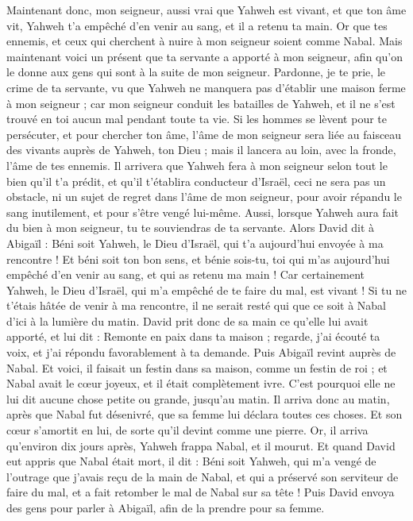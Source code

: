 \begin{multicols}{2}
Maintenant donc, mon seigneur, aussi vrai que Yahweh est vivant, et que ton âme vit, Yahweh t'a empêché d'en venir au sang, et il a retenu ta main. Or que tes ennemis, et ceux qui cherchent à nuire à mon seigneur soient comme Nabal.
Mais maintenant voici un présent que ta servante a apporté à mon seigneur, afin qu'on le donne aux gens qui sont à la suite de mon seigneur.
Pardonne, je te prie, le crime de ta servante, vu que Yahweh ne manquera pas d'établir une maison ferme à mon seigneur ; car mon seigneur conduit les batailles de Yahweh, et il ne s'est trouvé en toi aucun mal pendant toute ta vie.
Si les hommes se lèvent pour te persécuter, et pour chercher ton âme, l'âme de mon seigneur sera liée au faisceau des vivants auprès de Yahweh, ton Dieu ; mais il lancera au loin, avec la fronde, l'âme de tes ennemis.
Il arrivera que Yahweh fera à mon seigneur selon tout le bien qu'il t'a prédit, et qu'il t'établira conducteur d'Israël,
ceci ne sera pas un obstacle, ni un sujet de regret dans l'âme de mon seigneur, pour avoir répandu le sang inutilement, et pour s'être vengé lui-même. Aussi, lorsque Yahweh aura fait du bien à mon seigneur, tu te souviendras de ta servante.
Alors David dit à Abigaïl : Béni soit Yahweh, le Dieu d'Israël, qui t'a aujourd'hui envoyée à ma rencontre !
Et béni soit ton bon sens, et bénie sois-tu, toi qui m'as aujourd'hui empêché d'en venir au sang, et qui as retenu ma main !
Car certainement Yahweh, le Dieu d'Israël, qui m'a empêché de te faire du mal, est vivant ! Si tu ne t'étais hâtée de venir à ma rencontre, il ne serait resté qui que ce soit à Nabal d'ici à la lumière du matin.
David prit donc de sa main ce qu'elle lui avait apporté, et lui dit : Remonte en paix dans ta maison ; regarde, j'ai écouté ta voix, et j'ai répondu favorablement à ta demande.
Puis Abigaïl revint auprès de Nabal. Et voici, il faisait un festin dans sa maison, comme un festin de roi ; et Nabal avait le cœur joyeux, et il était complètement ivre. C'est pourquoi elle ne lui dit aucune chose petite ou grande, jusqu'au matin.
Il arriva donc au matin, après que Nabal fut désenivré, que sa femme lui déclara toutes ces choses. Et son cœur s'amortit en lui, de sorte qu'il devint comme une pierre.
Or, il arriva qu'environ dix jours après, Yahweh frappa Nabal, et il mourut.
Et quand David eut appris que Nabal était mort, il dit : Béni soit Yahweh, qui m'a vengé de l'outrage que j'avais reçu de la main de Nabal, et qui a préservé son serviteur de faire du mal, et a fait retomber le mal de Nabal sur sa tête ! Puis David envoya des gens pour parler à Abigaïl, afin de la prendre pour sa femme.

\end{multicols}
